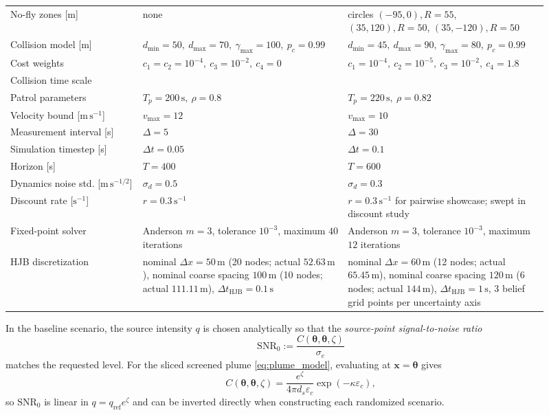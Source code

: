 \documentclass{article}
\newcommand{\bs}[1]{\boldsymbol{#1}}
\newcommand{\x}{\mathbf{x}}
\begin{document}
\begin{table}[p]
\begin{tabular}{@{}>{\raggedright\arraybackslash}p{0.23\linewidth}>{\raggedright\arraybackslash}p{0.34\linewidth}>{\raggedright\arraybackslash}p{0.34\linewidth}@{}}
    No-fly zones [m] & none & circles $(-95,0),R=55$, $(35,120),R=50$, $(35,-120),R=50$ \\
    Collision model [m] & $d_{\min}=50,\ d_{\max}=70,\ \gamma_{\max}=100,\ p_c=0.99$ & $d_{\min}=45,\ d_{\max}=90,\ \gamma_{\max}=80,\ p_c=0.99$ \\
    Cost weights & $c_1=c_2=10^{-4},\ c_3=10^{-2},\ c_4=0$ & $c_1=10^{-4},\ c_2=10^{-5},\ c_3=10^{-2},\ c_4=1.8$ \\
    Collision time scale & \multicolumn{2}{c}{$\tau_{\mathrm{col}}=1\,\mathrm{s}$} \\ %
    Patrol parameters & $T_p=200\,\mathrm{s},\ \rho=0.8$ & $T_p=220\,\mathrm{s},\ \rho=0.82$ \\
    Velocity bound [$\mathrm{m\,s^{-1}}$] & $v_{\max}=12$ & $v_{\max}=10$ \\
    Measurement interval [s] & $\Delta=5$ & $\Delta=30$ \\
    Simulation timestep [s] & $\Delta t=0.05$ & $\Delta t=0.1$ \\
    Horizon [s] & $T=400$ & $T=600$ \\
    Dynamics noise std. [$\mathrm{m\,s^{-1/2}}$] & $\sigma_d=0.5$ & $\sigma_d=0.3$ \\
    Discount rate [$\mathrm{s^{-1}}$] & $r=0.3\,\mathrm{s^{-1}}$ & $r=0.3\,\mathrm{s^{-1}}$ for pairwise showcase; swept in discount study \\
    Fixed-point solver & Anderson $m=3$, tolerance $10^{-3}$, maximum $40$ iterations & Anderson $m=3$, tolerance $10^{-3}$, maximum $12$ iterations \\
    HJB discretization & nominal $\Delta x=50\,\mathrm{m}$ (20 nodes; actual $52.63\,\mathrm{m}$), nominal coarse spacing $100\,\mathrm{m}$ (10 nodes; actual $111.11\,\mathrm{m}$), $\Delta t_{\mathrm{HJB}}=0.1\,\mathrm{s}$ & nominal $\Delta x=60\,\mathrm{m}$ (12 nodes; actual $65.45\,\mathrm{m}$), nominal coarse spacing $120\,\mathrm{m}$ (6 nodes; actual $144\,\mathrm{m}$), $\Delta t_{\mathrm{HJB}}=1\,\mathrm{s}$, $3$ belief grid points per uncertainty axis \\
    \bottomrule
  \end{tabular}
\end{table}

In the baseline scenario, the source intensity $q$ is chosen analytically so that the \emph{source-point signal-to-noise ratio}
\begin{equation}
\label{eq:snr0_definition}
\mathrm{SNR}_0
:=
\frac{C(\bs\theta,\bs\theta,\zeta)}{\sigma_e}
\end{equation}
matches the requested level.
For the sliced screened plume \eqref{eq:plume_model}, evaluating at $\x=\bs\theta$ gives
\begin{equation}
\label{eq:snr0_sliced_plume}
C(\bs\theta,\bs\theta,\zeta)
=
\frac{e^\zeta}{4\pi d_s \varepsilon_c}\exp(-\kappa\varepsilon_c),
\end{equation}
so $\mathrm{SNR}_0$ is linear in $q=q_{\mathrm{ref}}e^\zeta$ and can be inverted directly when constructing each randomized scenario.
\end{document}
